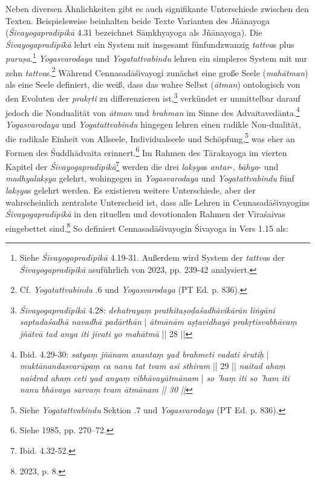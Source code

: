 Neben diversen Ähnlichkeiten gibt es auch signifikante Unterschiede zwischen den Texten. Beispielsweise beinhalten beide Texte Varianten des Jñānayoga (\textit{Śivayogapradīpikā} 4.31 bezeichnet Sāṃkhyayoga als Jñānayoga). Die \textit{Śivayogapradīpikā} lehrt ein System mit insgesamt fünfundzwanzig \textit{tattva}s plus \textit{puruṣa}.\footnote{Siehe \textit{Śivayogapradīpikā} 4.19-31. Außerdem wird System der \textit{tattva}s der \textit{Śivayogapradīpikā} asuführlich von \citeauthor{powell2023} 2023, pp. 239-42 analysiert.} \textit{Yogasvarodaya} und \textit{Yogatattvabindu} lehren ein simpleres System mit nur zehn \textit{tattva}s.\footnote{Cf. \textit{Yogatattvabindu} .6 und \textit{Yogasvarodaya} (PT Ed. p. 836).} Während Cennasadāśivayogi zunächst eine große Seele (\textit{mahātman}) als eine Seele definiert, die weiß, dass das wahre Selbst (\textit{ātman}) ontologisch von den Evoluten der \textit{prakṛti} zu differenzieren ist,\footnote{\textit{Śivayogapradīpikā} 4.28: \textit{dehatrayaṃ prathitaṣoḍaśadhāvikārān liṅgāni saptadaśadhā navadhā padārthān} | \textit{ātmānām aṣṭavidhayā prakṛtisvabhāvaṃ jñātvā tad anya iti jīvati yo mahātmā} || 28 ||} verkündet er unmittelbar darauf jedoch die Nondualität von \textit{ātman} und \textit{brahman} im Sinne des Advaitavedānta.\footnote{Ibid. 4.29-30: \textit{satyaṃ jñānam anantaṃ yad brahmeti vadati śrutiḥ} | \textit{muktānandasvarūpaṃ ca nanu tat tvam asi sthiram} || 29 || \textit{naitad ahaṃ naidrad ahaṃ ceti yad anyaṃ vibhāvayātmānam} | \textit{so 'haṃ iti so 'ham iti nanu bhāvaya sarvaṃ tvam ātmānam || 30 ||}} \textit{Yogasvarodaya} und \textit{Yogatattvabindu} hingegen lehren einen radikle Non-dualität, die radikale Einheit von Allseele, Individualseele und Schöpfung,\footnote{Siehe \textit{Yogatattvabindu} Sektion .7 und \textit{Yogasvarodaya} (PT Ed. p. 836).} was eher an Formen des Śuddhādvaita erinnert.\footnote{Siehe \citeauthor{glasenapp1949philosophie} 1985, pp. 270–72.}
 Im Rahmen des Tārakayoga im vierten Kapitel der \textit{Śivayogapradīpikā}\footnote{Ibid. 4.32-52.} werden die drei \textit{lakṣya}s \textit{antar}-, \textit{bāhya}- und \textit{madhyalakṣya} gelehrt, wohingegen in \textit{Yogasvarodaya} und \textit{Yogatattvabindu} fünf \textit{lakṣya}s gelehrt werden.
Es existieren weitere Unterschiede, aber der wahrscheinlich zentralste Unterscheid ist, dass alle Lehren in Cennasadāśivayogins \textit{Śivayogapradīpikā} in den rituellen und devotionalen Rahmen der Vīraśaivas eingebettet sind.\footnote{\citeauthor{powell2023} 2023, p. 8.} So definiert Cennasadāśivayogin Śivayoga in Vers 1.15 als:
